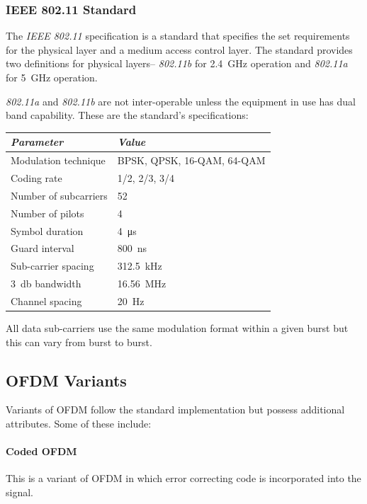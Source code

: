 \subsubsection{IEEE 802.11 Standard}
The \emph{IEEE 802.11} specification is a standard that specifies the set requirements for the physical layer and a medium access control layer. The standard provides two definitions for physical layers-- \emph{802.11b} for \SI{2.4}{\giga\hertz} operation and \emph{802.11a} for \SI{5}{\giga\hertz} operation\cite{802.11}.

\emph{802.11a} and \emph{802.11b} are not inter-operable unless the equipment in use has dual band capability. These are the standard's specifications:
\begin{table}
	\centering
	\renewcommand{\arraystretch}{1.5}
	\begin{tabular}{l l}
		\emph{Parameter} & \emph{Value}\\
		\hline
		Modulation technique & BPSK, QPSK, 16-QAM, 64-QAM \\
		Coding rate & 1/2, 2/3, 3/4 \\
		Number of subcarriers & 52 \\
		Number of pilots & 4 \\
		Symbol duration & \SI{4}{\micro\second} \\
		Guard interval & \SI{800}{\nano\second} \\
		Sub-carrier spacing & \SI{312.5}{\kilo\hertz} \\
		\SI{3}{\decibel} bandwidth & \SI{16.56}{\mega\hertz} \\
		Channel spacing & \SI{20}{\hertz}
	\end{tabular}
	\label{tab:litRev:802.11}
\end{table}
All data sub-carriers use the same modulation format within a given burst but this can vary from burst to burst.

\subsection{OFDM Variants}
Variants of OFDM follow the standard implementation but possess additional attributes. Some of these include:
\paragraph{Coded OFDM} This is a variant of OFDM in which error correcting code is incorporated into the signal.
